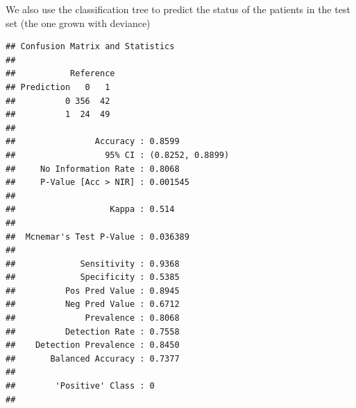 \documentclass[10pt,ignorenonframetext,]{beamer}
\newenvironment{Shaded}{\begin{snugshade}}{\end{snugshade}}
\newcommand{\KeywordTok}[1]{\textcolor[rgb]{0.13,0.29,0.53}{\textbf{#1}}}
\newcommand{\DataTypeTok}[1]{\textcolor[rgb]{0.13,0.29,0.53}{#1}}
\newcommand{\StringTok}[1]{\textcolor[rgb]{0.31,0.60,0.02}{#1}}
\newcommand{\OperatorTok}[1]{\textcolor[rgb]{0.81,0.36,0.00}{\textbf{#1}}}
\newcommand{\NormalTok}[1]{#1}
\begin{document}
\begin{frame}[fragile]

We also use the classification tree to predict the status of the
patients in the test set (the one grown with deviance)

\footnotesize

\begin{Shaded}
\end{Shaded}

\begin{verbatim}
## Confusion Matrix and Statistics
## 
##           Reference
## Prediction   0   1
##          0 356  42
##          1  24  49
##                                           
##                Accuracy : 0.8599          
##                  95% CI : (0.8252, 0.8899)
##     No Information Rate : 0.8068          
##     P-Value [Acc > NIR] : 0.001545        
##                                           
##                   Kappa : 0.514           
##                                           
##  Mcnemar's Test P-Value : 0.036389        
##                                           
##             Sensitivity : 0.9368          
##             Specificity : 0.5385          
##          Pos Pred Value : 0.8945          
##          Neg Pred Value : 0.6712          
##              Prevalence : 0.8068          
##          Detection Rate : 0.7558          
##    Detection Prevalence : 0.8450          
##       Balanced Accuracy : 0.7377          
##                                           
##        'Positive' Class : 0               
## 
\end{verbatim}

\normalsize

\end{frame}
\end{document}

